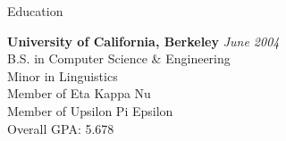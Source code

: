 \documentclass[
	11pt, %
]{resume} %
\begin{document}

\begin{rSection}{Education}
	
	\textbf{University of California, Berkeley} \hfill \textit{June 2004} \\ 
	B.S. in Computer Science \& Engineering \\
	Minor in Linguistics \smallskip \\
	Member of Eta Kappa Nu \\
	Member of Upsilon Pi Epsilon \\
	Overall GPA: 5.678
	
\end{rSection}

\end{document}

